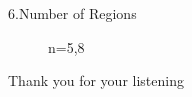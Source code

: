 \documentclass{beamer}
\begin{document}
\begin{frame}{6.Number of Regions}
\begin{figure}
		\caption{n=5,8}
	\end{figure}
\end{frame}



\begin{tframe}
  \vspace{8em} {\large Thank you for your listening}
\end{tframe}
\end{document}
